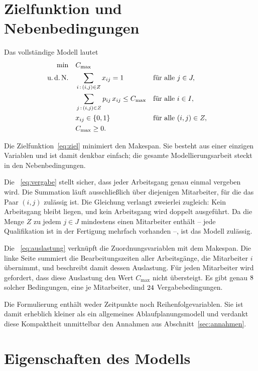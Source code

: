\section{Zielfunktion und Nebenbedingungen}
\label{sec:zielfunktion}

Das vollständige Modell lautet
\begin{align}
  \min \quad & C_{\max} \label{eq:ziel} \\
  \text{u.\,d.\,N.} \quad
  & \sum_{i \,:\, (i,j) \in Z} x_{ij} = 1
    && \text{für alle } j \in J , \label{eq:vergabe} \\
  & \sum_{j \,:\, (i,j) \in Z} p_{ij}\, x_{ij} \leq C_{\max}
    && \text{für alle } i \in I , \label{eq:auslastung} \\
  & x_{ij} \in \{0,1\}
    && \text{für alle } (i,j) \in Z , \label{eq:binaer} \\
  & C_{\max} \geq 0 . \label{eq:nichtneg}
\end{align}

Die Zielfunktion~\eqref{eq:ziel} minimiert den Makespan. Sie besteht aus einer
einzigen Variablen und ist damit denkbar einfach; die gesamte Modellierungsarbeit
steckt in den Nebenbedingungen.

Die ~\eqref{eq:vergabe} stellt sicher, dass jeder
Arbeitsgang genau einmal vergeben wird. Die Summation läuft ausschließlich über
diejenigen Mitarbeiter, für die das Paar $(i,j)$ zulässig ist. Die Gleichung
verlangt zweierlei zugleich: Kein Arbeitsgang bleibt liegen, und kein
Arbeitsgang wird doppelt ausgeführt. Da die Menge $Z$ zu jedem $j \in J$
mindestens einen Mitarbeiter enthält -- jede Qualifikation ist in der Fertigung
mehrfach vorhanden --, ist das Modell zulässig.

Die ~\eqref{eq:auslastung} verknüpft die
Zuordnungsvariablen mit dem Makespan. Die linke Seite summiert die
Bearbeitungszeiten aller Arbeitsgänge, die Mitarbeiter $i$ übernimmt, und
beschreibt damit dessen Auslastung. Für jeden Mitarbeiter wird gefordert, dass
diese Auslastung den Wert $C_{\max}$ nicht übersteigt. Es gibt genau
$8{}$ solcher Bedingungen, eine je Mitarbeiter, und
$24{}$ Vergabebedingungen.

Die Formulierung enthält weder Zeitpunkte noch Reihenfolgevariablen. Sie ist
damit erheblich kleiner als ein allgemeines Ablaufplanungsmodell und verdankt
diese Kompaktheit unmittelbar den Annahmen aus Abschnitt~\ref{sec:annahmen}.

\section{Eigenschaften des Modells}
\label{sec:eigenschaften}


